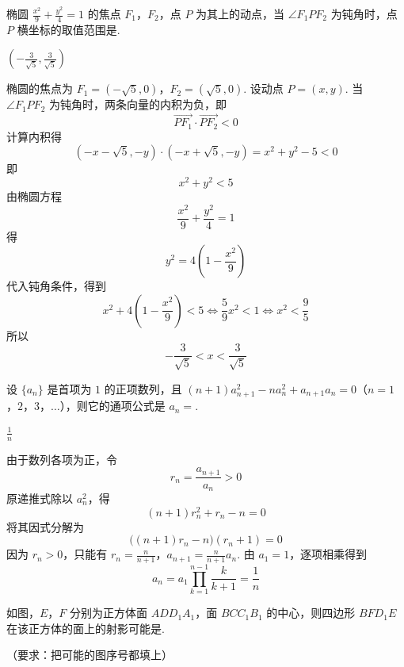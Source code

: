 \begin{problem}
椭圆 \(\frac{x^{2}}{9} + \frac{y^{2}}{4} = 1\) 的焦点 \(F_{1}\)，\(F_{2}\)，点 \(P\) 为其上的动点，当 \(\angle F_{1}PF_{2}\) 为钝角时，点 \(P\) 横坐标的取值范围是\fillinblank{}.
\end{problem}

\begin{answer}
\(\left(-\frac{3}{\sqrt{5}},\frac{3}{\sqrt{5}}\right)\)
\end{answer}

\begin{solution}
椭圆的焦点为
\(F_1=(-\sqrt{5},0)\)，\(F_2=(\sqrt{5},0)\).
设动点 \(P=(x,y)\). 当 \(\angle F_1PF_2\) 为钝角时，两条向量的内积为负，即
\[
\overrightarrow{PF_1}\cdot\overrightarrow{PF_2}<0
\]
计算内积得
\[
(-x-\sqrt5,-y)\cdot(-x+\sqrt5,-y)=x^2+y^2-5<0
\]
即
\[
x^2+y^2<5
\]
由椭圆方程
\[
\frac{x^2}{9}+\frac{y^2}{4}=1
\]
得
\[
y^2=4\left(1-\frac{x^2}{9}\right)
\]
代入钝角条件，得到
\[
x^2+4\left(1-\frac{x^2}{9}\right)<5
\iff \frac59x^2<1
\iff x^2<\frac95
\]
所以
\[
-\frac3{\sqrt5}<x<\frac3{\sqrt5}
\]
\end{solution}

\begin{problem}
设 \(\{a_{n}\}\) 是首项为 \(1\) 的正项数列，且 \((n+1)a_{n+1}^{2} - na_{n}^{2} + a_{n+1}a_{n} = 0\)（\(n=1\)，\(2\)，\(3\)，\(\ldots\)），则它的通项公式是 \(a_{n}=\)\fillinblank{}.
\end{problem}

\begin{answer}
\(\frac{1}{n}\)
\end{answer}

\begin{solution}
由于数列各项为正，令
\[
r_n=\frac{a_{n+1}}{a_n}>0
\]
原递推式除以 \(a_n^2\)，得
\[
(n+1)r_n^2+r_n-n=0
\]
将其因式分解为
\[
\bigl((n+1)r_n-n\bigr)(r_n+1)=0
\]
因为 \(r_n>0\)，只能有
\(r_n=\frac{n}{n+1}\)，\(a_{n+1}=\frac{n}{n+1}a_n\).
由 \(a_1=1\)，逐项相乘得到
\[
a_n=a_1\prod_{k=1}^{n-1}\frac{k}{k+1}
=\frac1n
\]
\end{solution}

\begin{problem}
如图，\(E\)，\(F\) 分别为正方体面 \(ADD_{1}A_{1}\)，面 \(BCC_{1}B_{1}\) 的中心，则四边形 \(BFD_{1}E\) 在该正方体的面上的射影可能是\fillinblank{}.

（要求：把可能的图序号都填上）

\end{problem}

